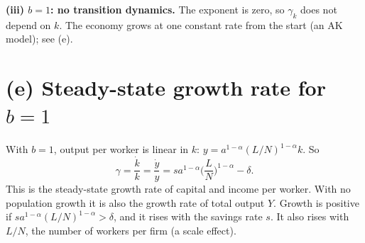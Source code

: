 \documentclass[11pt]{article}
\begin{document}
\textbf{(iii) $b=1$: no transition dynamics.} The exponent is zero, so $\gamma_k$ does not depend on
$k$. The economy grows at one constant rate from the start (an AK model); see (e).

\section*{(e) Steady-state growth rate for $b=1$}

With $b=1$, output per worker is linear in $k$:
$y = a^{1-\alpha}(L/N)^{1-\alpha}k$. So
\[
\gamma = \frac{\dot k}{k} = \frac{\dot y}{y} = s a^{1-\alpha}\Big(\frac{L}{N}\Big)^{1-\alpha} - \delta .
\]
This is the steady-state growth rate of capital and income per worker. With no population growth
it is also the growth rate of total output $Y$. Growth is positive if
$s a^{1-\alpha}(L/N)^{1-\alpha} > \delta$, and it rises with the savings rate $s$.
It also rises with $L/N$, the number of workers per firm (a scale effect).
\end{document}
